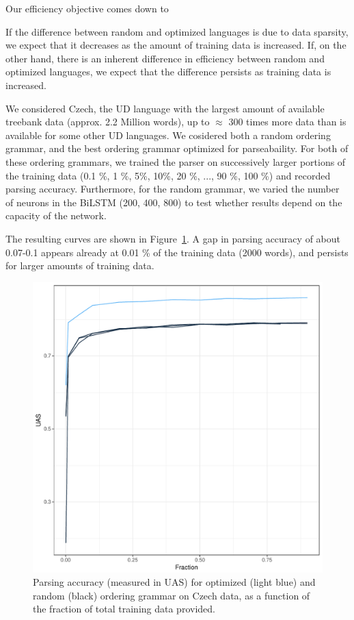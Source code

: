 \documentclass[12pt]{article}
\begin{document}
Our efficiency objective comes down to 


If the difference between random and optimized languages is due to data sparsity, we expect that it decreases as the amount of training data is increased.
If, on the other hand, there is an inherent difference in efficiency between random and optimized languages, we expect that the difference persists as training data is increased.

We considered Czech, the UD language with the largest amount of available treebank data (approx. 2.2 Million words), up to $\approx$ 300 times more data than is available for some other UD languages.
We cosidered both a random ordering grammar, and the best ordering grammar optimized for parseabaility.
For both of these ordering grammars, we trained the parser on successively larger portions of the training data (0.1 \%, 1 \%, 5\%, 10\%, 20 \%, ..., 90 \%, 100 \%) and recorded parsing accuracy.
Furthermore, for the random grammar, we varied the number of neurons in the BiLSTM (200, 400, 800) to test whether results depend on the capacity of the network.


The resulting curves are shown in Figure~\ref{fig:learning-czech}.
A gap in parsing accuracy of about 0.07-0.1 appears already at 0.01 \% of the training data (2000 words), and persists for larger amounts of training data.

\begin{figure}
    \centering
    \includegraphics[scale=.4]{figures/learning-parser-czech.pdf} 
        \caption{Parsing accuracy (measured in UAS) for optimized (light blue) and random (black) ordering grammar on Czech data, as a function of the fraction of total training data provided.}
    \label{fig:learning-czech}
\end{figure}





\section{}






\end{document}
